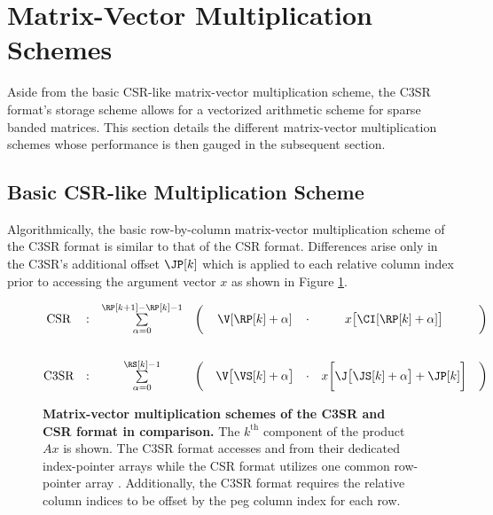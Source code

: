   \section{Matrix-Vector Multiplication Schemes} \label{subsec:matrix-vector-multiplication-schemes}

    Aside from the basic CSR-like matrix-vector multiplication scheme, the C3SR format's storage scheme allows for a vectorized arithmetic scheme for sparse banded matrices. This section details the different matrix-vector multiplication schemes whose performance is then gauged in the subsequent section.

    \subsection{Basic CSR-like Multiplication Scheme} \label{subsubsec:basic-csr-like-multiplication-scheme}

      Algorithmically, the basic row-by-column matrix-vector multiplication scheme of the C3SR format is similar to that of the CSR format. Differences arise only in the C3SR's additional offset $\JP[k]$ which is applied to each relative column index prior to accessing the argument vector $x$ as shown in Figure \ref{fig:c3sr_matvecmult_basic}.

      \begin{figure}[ht]
        \centering
        $$
        \begin{matrix}
          \text{CSR}  & : & \sum \limits_{\alpha = 0}^{\RP[k+1] - \RP[k] - 1} & \bigg( & \V[\RP[k] + \alpha]   & \cdot & x\big[\CI[\RP[k] + \alpha]\big] & \bigg)\\
          \vspace{0.3cm} \\
          \text{C3SR} & : & \sum \limits_{\alpha = 0}^{\RS[k] - 1} & \bigg( & \V\big[\VS[k] + \alpha\big] & \cdot & x\bigg[\J\big[\JS[k] + \alpha\big] + \JP[k]\bigg] & \bigg) \\
        \end{matrix}
        $$
        \caption[Matrix-vector multiplication schemes of the C3SR and CSR format in comparison.]{\textbf{Matrix-vector multiplication schemes of the C3SR and CSR format in comparison.} The $k^{\text{th}}$ component of the product $Ax$ is shown. The C3SR format accesses \V and \J from their dedicated index-pointer arrays while the CSR format utilizes one common row-pointer array \RP. Additionally, the C3SR format requires the relative column indices to be offset by the peg column index for each row.}
        \label{fig:c3sr_matvecmult_basic}
      \end{figure}

